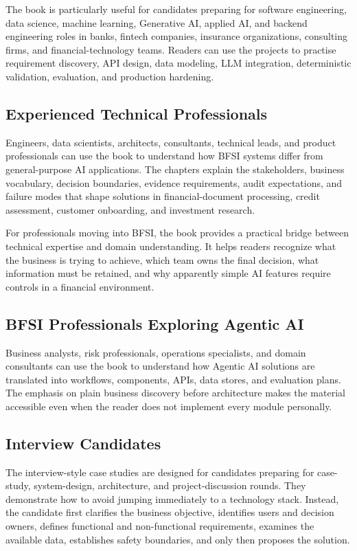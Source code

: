 The book is particularly useful for candidates preparing for software engineering, data science, machine learning, Generative AI, applied AI, and backend engineering roles in banks, fintech companies, insurance organizations, consulting firms, and financial-technology teams. Readers can use the projects to practise requirement discovery, API design, data modeling, LLM integration, deterministic validation, evaluation, and production hardening.

\subsection*{Experienced Technical Professionals}

Engineers, data scientists, architects, consultants, technical leads, and product professionals can use the book to understand how BFSI systems differ from general-purpose AI applications. The chapters explain the stakeholders, business vocabulary, decision boundaries, evidence requirements, audit expectations, and failure modes that shape solutions in financial-document processing, credit assessment, customer onboarding, and investment research.

For professionals moving into BFSI, the book provides a practical bridge between technical expertise and domain understanding. It helps readers recognize what the business is trying to achieve, which team owns the final decision, what information must be retained, and why apparently simple AI features require controls in a financial environment.

\subsection*{BFSI Professionals Exploring Agentic AI}

Business analysts, risk professionals, operations specialists, and domain consultants can use the book to understand how Agentic AI solutions are translated into workflows, components, APIs, data stores, and evaluation plans. The emphasis on plain business discovery before architecture makes the material accessible even when the reader does not implement every module personally.

\subsection*{Interview Candidates}

The interview-style case studies are designed for candidates preparing for case-study, system-design, architecture, and project-discussion rounds. They demonstrate how to avoid jumping immediately to a technology stack. Instead, the candidate first clarifies the business objective, identifies users and decision owners, defines functional and non-functional requirements, examines the available data, establishes safety boundaries, and only then proposes the solution.

